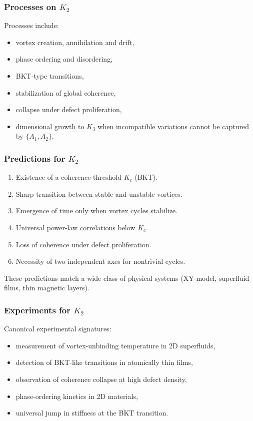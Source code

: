\subsubsection{Processes on \texorpdfstring{$K_2$}{K_2}}

Processes include:
\begin{itemize}
    \item vortex creation, annihilation and drift,
    \item phase ordering and disordering,
    \item BKT-type transitions,
    \item stabilization of global coherence,
    \item collapse under defect proliferation,
    \item dimensional growth to $K_3$ when incompatible variations
          cannot be captured by $\{A_1, A_2\}$.
\end{itemize}

\subsubsection{Predictions for \texorpdfstring{$K_2$}{K_2}}

\begin{enumerate}
    \item Existence of a coherence threshold $K_c$ (BKT).
    \item Sharp transition between stable and unstable vortices.
    \item Emergence of time only when vortex cycles stabilize.
    \item Universal power-law correlations below $K_c$.
    \item Loss of coherence under defect proliferation.
    \item Necessity of two independent axes for nontrivial cycles.
\end{enumerate}

These predictions match a wide class of physical systems (XY-model,
superfluid films, thin magnetic layers).

\subsubsection{Experiments for \texorpdfstring{$K_2$}{K_2}}

Canonical experimental signatures:
\begin{itemize}
    \item measurement of vortex-unbinding temperature in 2D superfluids,
    \item detection of BKT-like transitions in atomically thin films,
    \item observation of coherence collapse at high defect density,
    \item phase-ordering kinetics in 2D materials,
    \item universal jump in stiffness at the BKT transition.
\end{itemize}

